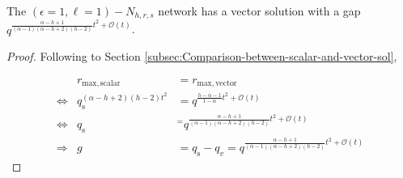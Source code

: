 \begin{cor}
The $\left(\epsilon=1,\ell=1\right)-\ensuremath{N}_{h,r,s}$ network
has a vector solution with a gap $q^{\frac{\alpha-h+1}{\left(\alpha-1\right)\left(\alpha-h+2\right)\left(h-2\right)}t^{2}+\mathcal{O}(t)}$.
\end{cor}
\begin{proof}
Following to Section \ref{subsec:Comparison-between-scalar-and-vector-sol},

\begin{eqnarray*}
 & r_{\mathrm{max,scalar}} & =r_{\mathrm{max,vector}}\\
\Leftrightarrow & q_{\mathrm{s}}^{\left(\alpha-h+2\right)\left(h-2\right)t^{2}} & =q^{\frac{h-\alpha-1}{1-\alpha}t^{2}+\mathcal{O}(t)}\\
\Leftrightarrow & q_{\mathrm{s}} & ^{=}q^{\frac{\alpha-h+1}{\left(\alpha-1\right)\left(\alpha-h+2\right)\left(h-2\right)}t^{2}+\mathcal{O}(t)}\\
\Rightarrow & g & =q_{\mathrm{s}}-q_{v}=q^{\frac{\alpha-h+1}{\left(\alpha-1\right)\left(\alpha-h+2\right)\left(h-2\right)}t^{2}+\mathcal{O}(t)}
\end{eqnarray*}
\end{proof}

